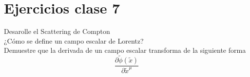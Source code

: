 \documentclass[../main_ej.tex]{subfiles}
\begin{document}
\section{Ejercicios clase 7}
Desarolle el Scattering de Compton \\
¿Cómo se define un campo escalar de Lorentz? \\
Demuestre que la derivada de un campo escalar transforma de la siguiente forma
\begin{equation*}
  \frac{\partial \tilde{\phi}(\tilde{x})}{\partial \tilde{x}^\mu}
\end{equation*}
 
\end{document}
